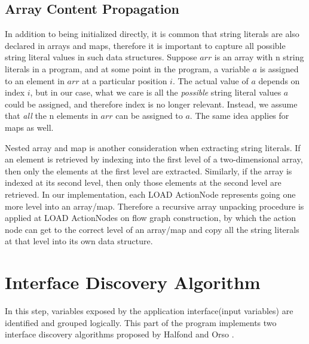 \subsection{Array Content Propagation}
\label{array_prop}
In addition to being initialized directly, it is common that string literals are also declared in arrays and maps, therefore it is important to capture all possible string literal values in such data structures. Suppose $arr$ is an array with n string literals in a program, and at some point in the program, a variable $a$ is assigned to an element in $arr$ at a particular position $i$. The actual value of $a$ depends on index $i$, but in our case, what we care is all the \textit{possible} string literal values $a$ could be assigned, and therefore index is no longer relevant. Instead, we assume that \textit{all} the n elements in $arr$ can be assigned to $a$. The same idea applies for maps as well.

Nested array and map is another consideration when extracting string literals. If an element is retrieved by indexing into the first level of a two-dimensional array, then only the elements at the first level are extracted. Similarly, if the array is indexed at its second level, then only those elements at the second level are retrieved. In our implementation, each LOAD ActionNode represents going one more level into an array/map. Therefore a recursive array unpacking procedure is applied at LOAD ActionNodes on flow graph construction, by which the action node can get to the correct level of an array/map and copy all the string literals at that level into its own data structure.


\section{Interface Discovery Algorithm}
In this step, variables exposed by the application interface(input variables) are identified and grouped logically. This part of the program implements two interface discovery algorithms proposed by Halfond and Orso \cite{ref3}.

